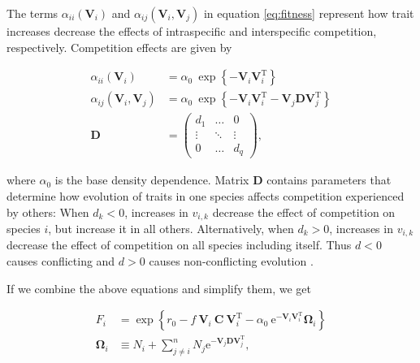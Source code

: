 The terms $\alpha_{ii}(\mathbf{V}_i)$ and $\alpha_{ij}(\mathbf{V}_i, \mathbf{V}_j)$
in equation \ref{eq:fitness} represent how trait increases decrease the effects
of intraspecific and interspecific competition, respectively.
Competition effects are given by

\begin{equation} \label{eq:competition}
\begin{split}
    \alpha_{ii}(\mathbf{V}_i) &= \alpha_0 ~\exp \left\{- \mathbf{V}_i
        \mathbf{V}_i^{\textrm{T}} \right\} \\
    \alpha_{ij}(\mathbf{V}_i, \mathbf{V}_j) &= \alpha_0 ~\exp \left\{
        - \mathbf{V}_i \mathbf{V}_i^{\textrm{T}} -
        \mathbf{V}_j \mathbf{D} \mathbf{V}_j^{\textrm{T}} \right\} \\
    \mathbf{D} &= \begin{pmatrix}
        d_1     & \ldots    & 0 \\
        \vdots  & \ddots    & \vdots \\
        0       & \ldots    & d_q
        \end{pmatrix}
	\textrm{,}
\end{split}
\end{equation}

\noindent where $\alpha_0$ is the base density dependence.
Matrix $\mathbf{D}$ contains parameters that determine how evolution of traits
in one species affects competition experienced by others:
When $d_k < 0$, increases in $v_{i,k}$ decrease the
effect of competition on species $i$, but increase it in all others.
Alternatively, when $d_k > 0$, increases in $v_{i,k}$ decrease the effect of
competition on all species including itself.
Thus $d < 0$ causes conflicting and $d > 0$ causes non-conflicting evolution
\citep{Northfield:2013if}.


If we combine the above equations and simplify them, we get

\begin{equation} \label{eq:fitness-full}
\begin{split}
    F_{i} &= \exp \left\{
        r_0 - f ~ \mathbf{V}_i ~ \mathbf{C} ~ \mathbf{V}_{i}^{\textrm{T}} -
        \alpha_0 ~\textrm{e}^{- \mathbf{V}_i \mathbf{V}_i^{\textrm{T}} } \mathbf{\Omega}_{i}
        \right\} \\
        \mathbf{\Omega}_i &\equiv N_i +
            \sum_{j \ne i}^{n}{ N_j \textrm{e}^{ - \mathbf{V}_j \mathbf{D} \mathbf{V}_j^{\textrm{T}} } }
        \textrm{,}
\end{split}
\end{equation}

